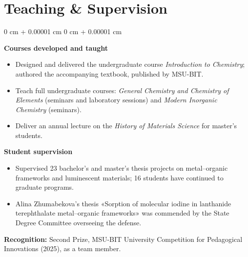 \documentclass[10pt, letterpaper]{article}
\newenvironment{highlights}{
    \begin{itemize}[
        topsep=0.05 cm,
        parsep=0.05 cm,
        partopsep=0pt,
        itemsep=0pt,
        leftmargin=0 cm + 10pt
    ]
}{
    \end{itemize}
} %
\newenvironment{onecolentry}{
    \begin{adjustwidth}{
        0 cm + 0.00001 cm
    }{
        0 cm + 0.00001 cm
    }
}{
    \end{adjustwidth}
} %
\begin{document}
    \section{Teaching \& Supervision}
    \vspace{0.04 cm}
    \begin{onecolentry}
    \textbf{Courses developed and taught}
    \begin{highlights}
        \item Designed and delivered the undergraduate course \textit{Introduction to Chemistry}; authored the accompanying textbook, published by MSU-BIT.
        \item Teach full undergraduate courses: \textit{General Chemistry and Chemistry of Elements} (seminars and laboratory sessions) and \textit{Modern Inorganic Chemistry} (seminars).
        \item Deliver an annual lecture on the \textit{History of Materials Science} for master's students.
    \end{highlights}

    \vspace{0.06cm}
    \textbf{Student supervision}
    \begin{highlights}
        \item Supervised 23 bachelor's and master's thesis projects on metal–organic frameworks and luminescent materials; 16 students have continued to graduate programs.
        \item Alina Zhumabekova's thesis «Sorption of molecular iodine in lanthanide terephthalate metal–organic frameworks» was commended by the State Degree Committee overseeing the defense.
    \end{highlights}

    \vspace{0.06cm}
    \textbf{Recognition:} Second Prize, MSU-BIT University Competition for Pedagogical Innovations (2025), as a team member.
    \end{onecolentry}
\end{document}
